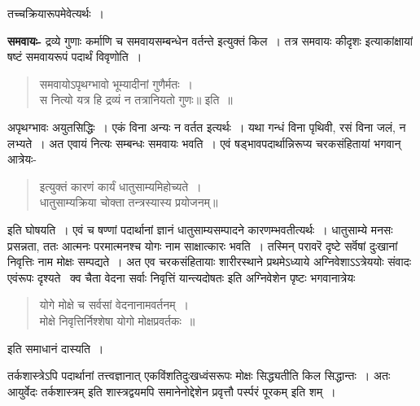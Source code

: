 {तच्चक्रियारूपमेवेत्यर्थः~। 

\textbf{समवायः-} द्रव्ये गुणाः कर्माणि च समवायसम्बन्धेन वर्तन्ते इत्युक्तं किल~। तत्र समवायः कीदृशः इत्याकांक्षायां षष्टं समवायरूपं पदार्थं विवृणोति~। 
\begin{verse}
समवायोऽपृथग्भावो भूम्यादीनां गुणैर्मतः~। \\
स नित्यो यत्र हि द्रव्यं न तत्रानियतो गुणः॥ इति~॥
\end{verse}
अपृथग्भावः अयुतसिद्धिः~। एकं विना अन्यः न वर्तत इत्यर्थः~। यथा गन्धं विना पृथिवी, रसं विना जलं, न लभ्यते~। अत एवायं नित्यः सम्बन्धः समवायः भवति~। एवं षड्भावपदार्थान्निरूप्य चरकसंहितायां भगवान् आत्रेयः-
\begin{verse}
इत्युक्तं कारणं कार्यं धातुसाम्यमिहोच्यते~। \\
धातुसाम्यक्रिया चोक्ता तन्त्रस्यास्य प्रयोजनम्॥
\end{verse}
इति घोषयति~। एवं च षण्णां पदार्थानां ज्ञानं धातुसाम्यसम्पादने कारणम्भवतीत्यर्थः~। धातुसाम्ये मनसः प्रसन्नता, ततः आत्मनः परमात्मनश्च योगः नाम साक्षात्कारः भवति~। तस्मिन् परावरॆ दृष्टे सर्वॆषां दुःखानां निवृत्तिः नाम मोक्षः सम्पद्यते~। अत एव चरकसंहितायाः शारीरस्थाने प्रथमेऽध्याये अग्निवेशाऽऽत्रेययोः संवादः एवंरूपः दृश्यते \ क्व चैता वेदना सर्वाः निवृत्तिं यान्त्यदोषतः इति अग्निवेशेन पृष्टः भगवानात्रेयः
\begin{verse}
योगे मोक्षे च सर्वसां वेदनानामवर्तनम्~। \\
मोक्षे निवृत्तिर्निश्शेषा योगो मोक्षप्रवर्तकः~॥
\end{verse}
इति समाधानं दास्यति~। 

तर्कशास्त्रेऽपि पदार्थानां तत्त्वज्ञानात् एकविंशतिदुःखध्वंसरूपः मोक्षः सिद्ध्यतीति किल सिद्धान्तः~। अतः आयुर्वेदः तर्कशास्त्रम् इति शास्त्रद्वयमपि समानेनोद्देशेन प्रवृत्तौ पर्स्परं पूरकम् इति शम्~। 

\articleend
}
